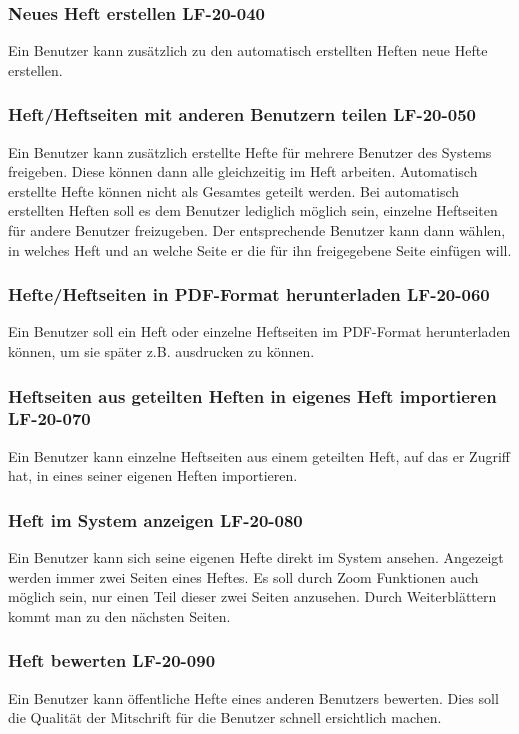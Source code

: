 \documentclass[12pt,a4paper,oneside,ngerman]{scrartcl}
\begin{document}
\subsubsection{Neues Heft erstellen \hfill LF-20-040}
Ein Benutzer kann zusätzlich zu den automatisch erstellten Heften neue Hefte erstellen.

\subsubsection{Heft/Heftseiten mit anderen Benutzern teilen \hfill LF-20-050}
Ein Benutzer kann zusätzlich erstellte Hefte für mehrere Benutzer des Systems freigeben. Diese können dann alle gleichzeitig im Heft arbeiten. Automatisch erstellte Hefte können nicht als Gesamtes geteilt werden. Bei automatisch erstellten Heften soll es dem Benutzer lediglich möglich sein, einzelne Heftseiten für andere Benutzer freizugeben. Der entsprechende Benutzer kann dann wählen, in welches Heft und an welche Seite er die für ihn freigegebene Seite einfügen will.

\subsubsection{Hefte/Heftseiten in PDF-Format herunterladen \hfill LF-20-060}
Ein Benutzer soll ein Heft oder einzelne Heftseiten im PDF-Format herunterladen können, um sie später z.B. ausdrucken zu können.

\subsubsection{Heftseiten aus geteilten Heften in eigenes Heft importieren \hfill LF-20-070}
Ein Benutzer kann einzelne Heftseiten aus einem geteilten Heft, auf das er Zugriff hat, in eines seiner eigenen Heften importieren.

\subsubsection{Heft im System anzeigen \hfill LF-20-080}
Ein Benutzer kann sich seine eigenen Hefte direkt im System ansehen. Angezeigt werden immer zwei Seiten eines Heftes. Es soll durch Zoom Funktionen auch möglich sein, nur einen Teil dieser zwei Seiten anzusehen. Durch Weiterblättern kommt man zu den nächsten Seiten.

\subsubsection{Heft bewerten \hfill LF-20-090}
Ein Benutzer kann öffentliche Hefte eines anderen Benutzers bewerten. Dies soll die Qualität der Mitschrift für die Benutzer schnell ersichtlich machen.
\end{document}
